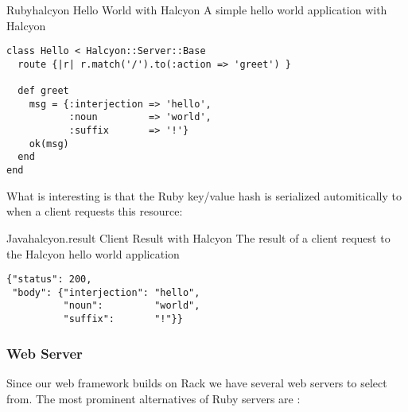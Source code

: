 \begin{scode}{Ruby}{halcyon}{%
  Hello World with Halcyon}{%
  A simple hello world application with Halcyon}
\begin{lstlisting}
class Hello < Halcyon::Server::Base
  route {|r| r.match('/').to(:action => 'greet') }
  
  def greet
    msg = {:interjection => 'hello',
           :noun         => 'world',
           :suffix       => '!'}
    ok(msg)
  end
end
\end{lstlisting}
\end{scode}

What is interesting is that the Ruby  key/value hash is serialized
automitically to  when a client requests this resource:

\begin{scode}{Java}{halcyon.result}{%
  Client Result with Halcyon}{%
  The result of a client request to the Halcyon hello world application}
\begin{lstlisting}
{"status": 200,
 "body": {"interjection": "hello",
          "noun":         "world",
          "suffix":       "!"}}
\end{lstlisting}
\end{scode}

\subsubsection{Web Server}

Since our web framework builds on Rack we have several web servers to select
from. The most prominent alternatives of Ruby servers are%
:

